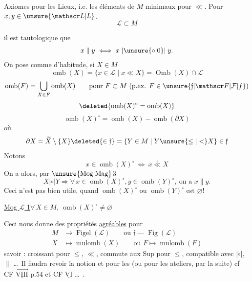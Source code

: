 
Axiomes pour les Lieux, i.e. les éléments de $M$ minimaux pour $\ll$. Pour $x,y\in\unsure{\mathscr L|L}$.
\[
\mathscr L\subset M
\]

il est tautologique que
\[
x\parallel y\ \Longleftrightarrow\ x\mathrel{|\unsure{\circ|0}|}y.
\]
 On pose comme d'habitude, si $X\in M$
\[
\operatorname{omb}(X)=\{x\in\mathscr L\mid x\ll X\}=\operatorname{Omb}(X)\cap\mathscr L
\]
\[
\operatorname{omb}(F)=\bigcup_{X\in F}\operatorname{omb}(X)\qquad\text{pour }F\subset M\ (\text{p.ex. }F\in\unsure{\mathfrak f|\mathscr F|\mathcal F|f})
\]
\[
\deleted{\operatorname{omb}(X)^\circ=\operatorname{omb}(X)}
\]
\[
\operatorname{omb}(X)^\circ=\operatorname{omb}(X)-\operatorname{omb}(\partial X)
\]
où
\[
\partial X=\widetilde X\setminus\{X\}\deleted{\in\mathfrak f}=\{Y\in M\mid Y\unsure{\leq|<}X\}\in\mathfrak f
\]
Notons
\[
x\in\operatorname{omb}(X)^\circ\ \Longleftrightarrow\ x\overset{\circ}{\ll}X
\]
On a alors, par $\unsure{\mathrm{Mog}|\mathrm{Mag}}\,3$
\[
X\mathrel{|\circ|}Y\Longrightarrow\forall\,x\in\operatorname{omb}(X)^\circ,y\in\operatorname{omb}(Y)^\circ,\ \text{on a }x\parallel y.
\]
Ceci n'est pas bien utile, quand $\operatorname{omb}(X)^\circ$ ou $\operatorname{omb}(Y)^\circ$ est $\varnothing$!

\uline{Mog $\mathscr L$ 1}\quad $\forall\,X\in M,\ \operatorname{omb}(X)^\circ\neq\varnothing$

Ceci nous  donne des propriétés \uline{agréables} pour
\[
\begin{aligned}
M&\longrightarrow\operatorname{Figel}(\mathscr L)\qquad\text{ou }\mathfrak f\;\text{---}\;\operatorname{Fig}(\mathscr L)\\
X&\longmapsto\operatorname{mulomb}(X)\qquad\text{ou }F\longmapsto\operatorname{mulomb}(F)
\end{aligned}
\]
savoir : croissant  pour $\leq$, $\ll$, commute aux Sup  pour $\leq$, compatible avec $\mathrel{|\circ|}$, $\parallel$ \ldots\ Il faudra revoir la notion  et   pour les   (ou pour les ateliers, par la suite) cf CF $\underline{\overrightarrow{\mathrm{VIII}}}$ p.54 et CF $\underline{\mathrm{VI}}$ \ldots\ .
